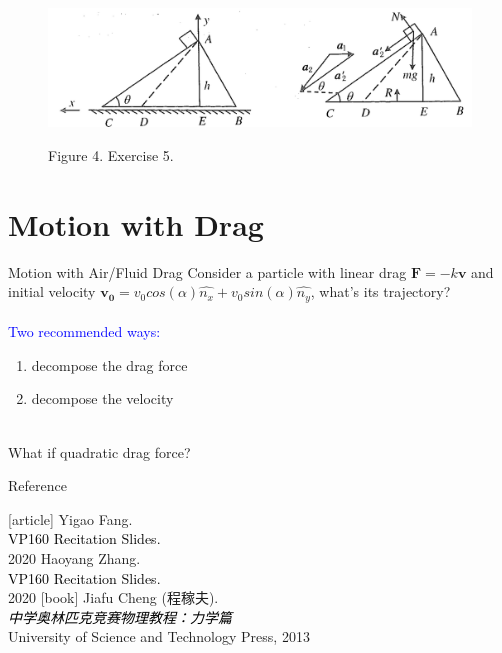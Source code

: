 \documentclass{beamer}
\begin{document}
\begin{frame}
  \begin{figure}[htbp]
    \centering
    \includegraphics[width=1 \linewidth, angle =0]{ex5.png}
    \begin{center}
      Figure 4. Exercise 5.
      \end{center}
    \label{fig:5}
    \end{figure}
\end{frame}

\section{Motion with Drag}
\begin{frame}{Motion with Air/Fluid Drag}
  Consider a particle with linear drag $\mathbf{F} = -k\mathbf{v}$ and initial velocity $\mathbf{v_0} = v_0cos(\alpha)\hat{n_x} + v_0sin(\alpha)\hat{n_y}$, what's its trajectory? \\
  ~\\
  \textcolor{blue}{Two recommended ways:}\\
  \begin{enumerate}
    \item decompose the drag force
    \item decompose the velocity
  \end{enumerate}
  ~\\
  What if quadratic drag force?
\end{frame}


\begin{frame}{Reference}
  \begin{thebibliography}{9}
  [article]
   Yigao Fang.\\
  \textcolor{black}{VP160 Recitation Slides.}\\
  2020
   Haoyang Zhang.\\
  \textcolor{black}{VP160 Recitation Slides.}\\
  2020
  [book]
   Jiafu Cheng (程稼夫).\\
  \textcolor{black}{\textit{中学奥林匹克竞赛物理教程：力学篇}}\\
  University of Science and Technology Press, 2013
  \end{thebibliography}
  \end{frame}
  
\end{document}
